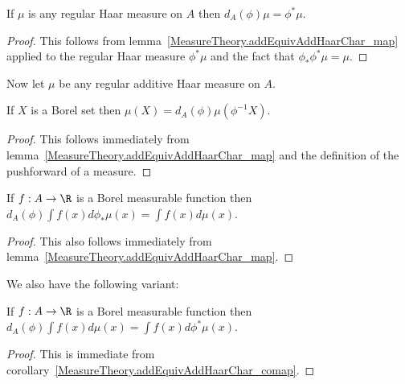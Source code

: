 \begin{corollary}
  \label{MeasureTheory.addEquivAddHaarChar_comap}
  \leanok
  If $\mu$ is any regular Haar measure on $A$ then
  $d_A(\phi)\mu = \phi^*\mu.$
\end{corollary}
\begin{proof}
  \leanok
  This follows from lemma~\ref{MeasureTheory.addEquivAddHaarChar_map}
  applied to the regular Haar measure $\phi^*\mu$ and the fact that $\phi_*\phi^*\mu=\mu$.
\end{proof}

Now let $\mu$ be any regular additive Haar measure on $A$.

\begin{lemma}
  \label{MeasureTheory.addEquivAddHaarChar_smul_preimage}
  \leanok
  If $X$ is a Borel set then $\mu(X)=d_A(\phi)\mu(\phi^{-1}X)$.
\end{lemma}
\begin{proof}
  \leanok
  This follows immediately from lemma~\ref{MeasureTheory.addEquivAddHaarChar_map}
  and the definition of the pushforward of a measure.
\end{proof}

\begin{lemma}
  \label{MeasureTheory.addEquivAddHaarChar_smul_integral_map}
  \leanok
  If $f:A\to\R$ is a Borel measurable function then
  $d_A(\phi)\int f(x)d\phi_*\mu(x)=\int f(x)d\mu(x)$.
\end{lemma}
\begin{proof}
  \leanok
  This also follows immediately from lemma~\ref{MeasureTheory.addEquivAddHaarChar_map}.
\end{proof}

We also have the following variant:

\begin{lemma}
  \label{MeasureTheory.addEquivAddHaarChar_smul_integral_comap}
  \leanok
  If $f:A\to\R$ is a Borel measurable function then
  $d_A(\phi)\int f(x)d\mu(x)=\int f(x)d\phi^*\mu(x)$.
\end{lemma}
\begin{proof}
  \leanok
  This is immediate from corollary~\ref{MeasureTheory.addEquivAddHaarChar_comap}.
\end{proof}

